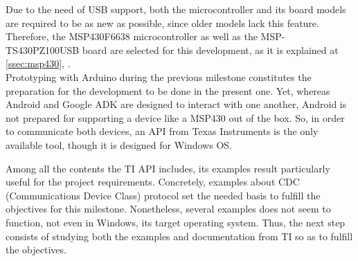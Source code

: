 		\begin{comment}
		Unlike the arduino's part where we know what we have to use and how we wil use it, now we found 
		that we just have an Texas Instruments(TI) API to comunicate the MSP430 with windows and our goal. 
		Both MSP430 microcontroller and MSP430 board was new devices because all the existing ones have no 
		USB port, the microcontroller is a MSP430 6638 and the board is a TS430PZ100USB(link to the MSP430 section).\\
		\end{comment}
		
		Due to the need of USB support, both the microcontroller and its board models are required to be
		as new as possible, since older models lack this feature. Therefore, the MSP430F6638 microcontroller
		as well as the MSP-TS430PZ100USB board are selected for this development, as it is explained at
		\autoref{ssec:msp430}, .\\
		
		Prototyping with Arduino during the previous milestone constitutes the preparation for the development
		to be done in the present one. Yet, whereas Android and Google ADK are designed to interact with
		one another, Android is not prepared for supporting a device like a MSP430 out of the box. So, in order to
		communicate both devices, an API from Texas Instruments \cite{TIUSB} is the only available tool, though
		it is designed for Windows OS.\\
		
		\begin{comment}
		Initialy in order to test the TI API we check some of the multiple examples, in our case was the 
		CDC examples that be usefull to learn about basic concepts of what we try to do. Also we try to 
		read part of the generic(not dependant of the MSP430 device nor USB protocol)documentation that 
		TI provides. And it didn't start too good, the first test with a example provide in the API didn't 
		work in windows, its target SO.
		\end{comment}
		
		Among all the contents the TI API includes, its examples result particularly useful for the project
		requirements. Concretely, examples about CDC (Communications Device Class) protocol set the needed
		basis to fulfill the objectives for this milestone. Nonetheless, several examples does not seem to
		function, not even in Windows, its target operating system. Thus, the next step consists of studying
		both the examples and documentation from TI so as to fulfill the objectives.
		
